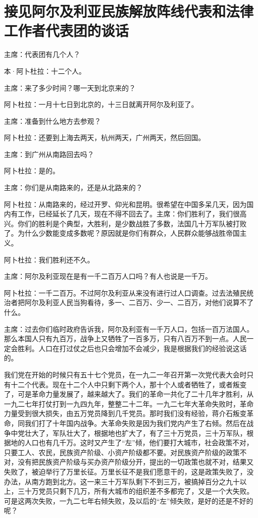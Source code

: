 \section[接见阿尔及利亚民族解放阵线代表和法律工作者代表团的谈话（一九六四年一月二十八日）]{接见阿尔及利亚民族解放阵线代表和法律工作者代表团的谈话}


主席：代表团有几个人？

本·阿卜杜拉：十二个人。

主席：来了多少时间？哪一天到北京来的？

阿卜杜拉：一月十七日到北京的，十三日就离开阿尔及利亚了。

主席：准备到什么地方去参观？

阿卜杜拉：还要到上海去两天，杭州两天，广州两天，然后回国。

主席：到广州从南路回去吗？

阿卜杜拉：是的。

主席：你们是从南路来的，还是从北路来的？

阿卜杜拉：从南路来的，经过开罗、仰光和昆明。很希望在中国多呆几天，因为国内有工作，已经延长了几天，现在不得不回去了。主席：你们胜利了，我们很高兴。你们的胜利是个典型，大胜利，是少数战胜了多数，法国几十万军队被打败了。为什么少数能变成多数呢？原因就是你们有群众，人民群众能够战胜帝国主义。

阿卜杜拉：我们胜利还不久。

主席：阿尔及利亚现在是有一千二百万人口吗？有人也说是一千万。

阿卜杜拉：一千二百万。不过阿尔及利亚从来没有进行过人口调查。过去法殖民统治者把阿尔及利亚人民当狗看待，多一、二百万、少一、二百万，对他们说算不了什么。

主席：过去你们临时政府告诉我，阿尔及利亚有一千万人口，包括一百万法国人。那么本国人只有九百万，战争上又牺牲了一百多万，只有八百万不到一点。人民一定会胜利。人口在打过仗之后也只会增加不会减少，我是根据我们的经验说这话的。

我们党在开始的时候只有五十七个党员，在一九二一年召开第一次党代表大会时只有十二个代表。现在十二个人中只剩下两个人，那十个人或者牺牲了，或者叛变了，可是革命力量发展了，越来越大了。我们的革命一共化了二十几年才胜利，从一九二七年打仗打到一九四九年，整整二十二年。一九二七年大革命失败时，革命力量受到很大损失，由五万党员降到几千党员。那时我们没有经验，蒋介石叛变革命，同我们打了十年国内战争。大革命失败是因为我们党内产生了右倾。然后在战争中党壮大了，军队壮大了，根据地也扩大了，有了三十万党员，三十万军队，根据地的人口也有几千万。这时又产生了“左”倾，他们要打大城市，社会政策不对，只要工人、农民，民族资产阶级、小资产阶级都不要。对民族资产阶级的政策不对，没有把民族资产阶级与买办资产阶级分开，提出的一切政策也就不对，结果又失败了，被迫举行了万里长征。万里长征不是我们愿意干的，这是政策失败了，没办法，从南方跑到北方。这一来三十万军队剩下不到三万，被搞掉百分之九十以上，三十万党员只剩下几万，所有大城市的组织差不多都完了，又是一个大失败。可是这两次失败，一九二七年右倾失败，及以后的“左”倾失败，是好的还是不好的呢？

